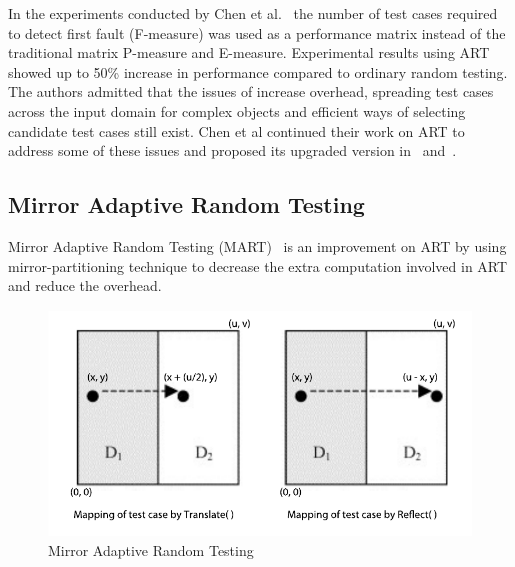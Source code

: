 In the experiments conducted by Chen et al.~\cite{Chen2008} the number of test cases required to detect first fault (F-measure) was used as a performance matrix instead of the traditional matrix P-measure and E-measure. Experimental results using ART showed up to 50\% increase in performance compared to ordinary random testing. The authors admitted that the issues of increase overhead, spreading test cases across the input domain for complex objects and efficient ways of selecting candidate test cases still exist. Chen et al continued their work on ART to address some of these issues and proposed its upgraded version in~\cite{chen2009enhanced} and~\cite{Chen2005}. 

\subsection{Mirror Adaptive Random Testing}
Mirror Adaptive Random Testing (MART)~\cite{Chen2003} is an improvement on ART by using mirror-partitioning technique to decrease the extra computation involved in ART and reduce the overhead.

\begin{figure}[h]
\begin{center}
	\includegraphics[width=13cm, height=6cm ]{Literature/mart2.pdf}
	\caption{Mirror Adaptive Random Testing~\cite{Chen2003}}
\label{fig:mirrorART}
\end{center}  
\end{figure}

